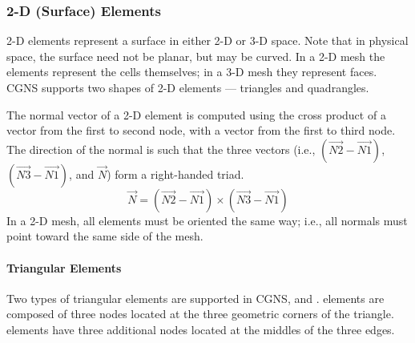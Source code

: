 {{{\subsubsection{2-D (Surface) Elements}

2-D elements represent a surface in either 2-D or 3-D space.
Note that in physical space, the surface need not be planar, but
may be curved.
In a 2-D mesh the elements represent the cells themselves; in a 3-D
mesh they represent faces.
CGNS supports two shapes of 2-D elements --- triangles and quadrangles.

The normal vector of a 2-D element is computed using the cross product
of a vector from the first to second node, with a vector from the first
to third node.
The direction of the normal is such that the three
vectors (i.e., $(\overrightarrow{N2} - \overrightarrow{N1})$, 
$(\overrightarrow{N3} - \overrightarrow{N1})$, and $\overrightarrow{N}$)
form a right-handed triad.
$$
\overrightarrow{N} = (\overrightarrow{N2} - \overrightarrow{N1}) \times
                     (\overrightarrow{N3} - \overrightarrow{N1})
$$
In a 2-D mesh, all elements must be oriented the same way; i.e., all
normals must point toward the same side of the mesh.

\paragraph{Triangular Elements}
Two types of triangular elements are supported in CGNS, 
and .
 elements are composed of three nodes located at the
three geometric corners of the triangle.
 elements have three additional nodes located at the
middles of the three edges.

}}}
